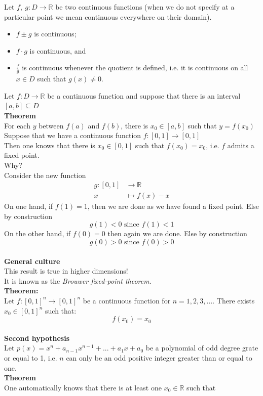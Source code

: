\documentclass[]{article}
\begin{document}
	Let $f,~g:D\rightarrow\mathbb{R}$ be two continuous functions (when we do not specify at a particular point we mean continuous everywhere on their domain).
	\begin{itemize}
		\item $f\pm g$ is continuous;
		\item $f\cdot g$ is continuous, and
		\item $\frac{f}{g}$ is continuous whenever the quotient is defined, i.e. it is continuous on all $x\in D$ such that $g(x)\ne 0$.	
	\end{itemize}
	Let $f:D\rightarrow\mathbb{R}$ be a continuous function and suppose that there is an interval $[a,b]\subseteq D$\\
 	{\bf Theorem}\\
	For each $y$ between $f(a)$ and $f(b)$, there is $x_0\in[a,b]$ such that $y=f(x_0)$\\
	Suppose that we have a continuous function $f:[0,1]\rightarrow[0,1]$\\
	Then one knows that there is $x_0\in[0,1]$ such that $f(x_0)=x_0$, i.e. $f$ admits a fixed point.\\
	Why?\\
	Consider the new function
	\begin{align*}
		g:[0,1]&\longrightarrow\mathbb{R}\\
		x&\mapsto f(x)-x
	\end{align*}
	On one hand, if $f(1)=1$, then we are done as we have found a fixed point. Else by construction
	$$
		g(1)<0\text{ since }f(1)<1
	$$
	On the other hand, if $f(0)=0$ then again we are done. Else by construction
	$$
		g(0)>0\text{ since }f(0)>0
	$$
	\pagebreak\\
	{\bf General culture}\\
	This result is true in higher dimensions!\\
	It is known as the \emph{Brouwer fixed-point theorem}.\\
	{\bf Theorem:}\\
	Let $f:[0,1]^n\rightarrow[0,1]^n$ be a continuous function for $n=1,2,3,...$. There exists $x_0\in[0,1]^n$ such that:
	$$
		f(x_0)=x_0
	$$\\
	{\bf Second hypothesis}\\
	Let $p(x)=x^n+a_{n-1}x^{n-1}+...+a_1x+a_0$ be a polynomial of odd degree grate or equal to 1, i.e. $n$ can only be an odd positive integer greater than or equal to one.\\
	{\bf Theorem}\\
	One automatically knows that there is at least one $x_0\in\mathbb{R}$ such that
\end{document}
